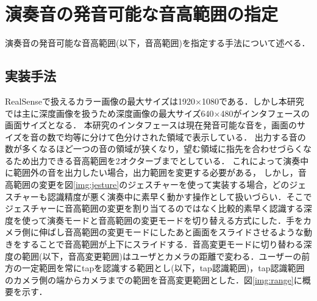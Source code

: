 \chapter{演奏音の発音可能な音高範囲の指定}
演奏音の発音可能な音高範囲(以下，音高範囲)を指定する手法について述べる．

\section{実装手法}
RealSenseで扱えるカラー画像の最大サイズは1920$\times$1080である．しかし本研究では主に深度画像を扱うため深度画像の最大サイズ640$\times$480がインタフェースの画面サイズとなる．
本研究のインタフェースは現在発音可能な音を，画面のサイズを音の数で均等に分けて色分けされた領域で表示している．
出力する音の数が多くなるほど一つの音の領域が狭くなり，望む領域に指先を合わせづらくなるため出力できる音高範囲を2オクターブまでとしている．
これによって演奏中に範囲外の音を出力したい場合，出力範囲を変更する必要がある，
しかし，音高範囲の変更を図\ref{img:jesture}のジェスチャーを使って実装する場合，どのジェスチャーも認識精度が悪く演奏中に素早く動かす操作として扱いづらい．そこでジェスチャーに音高範囲の変更を割り当てるのではなく比較的素早く認識する深度を使って演奏モードと音高範囲の変更モードを切り替える方式にした．手をカメラ側に伸ばし音高範囲の変更モードにしたあと画面をスライドさせるような動きをすることで音高範囲が上下にスライドする．音高変更モードに切り替わる深度の範囲(以下，音高変更範囲)はユーザとカメラの距離で変わる．ユーザーの前方の一定範囲を常にtapを認識する範囲とし(以下，tap認識範囲)，tap認識範囲のカメラ側の端からカメラまでの範囲を音高変更範囲とした．図\ref{img:range}に概要を示す．

